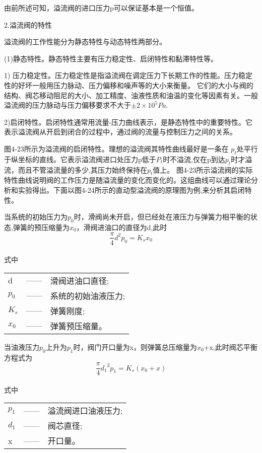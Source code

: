 \par 由前所述可知，溢流阀的进口压力p可以保证基本是一个恒值。
\par 2.溢流阀的特性
\par 溢流阀的工作性能分为静态特性与动态特性两部分。
\par (1)静态特性。静态特性主要有压力稳定性、启闭特性和黏滞特性等。
\par 1) 压力稳定性。压力稳定性是指溢流阀在调定压力下长期工作的性能。压力稳定性的好坏一般用压力脉动、压力偏移和噪声等的大小来衡量。
它们的大小与阀的结构、阀芯移动阻尼的大小、加工精度、油液性质和油温的变化等因素有关。一般溢流阀的压力脉动与压力偏移要求不大于$\pm2×10^5Pa$.
\par 2)启闭特性。启闭特性通常用流量-压力曲线表示，是静态特性中的重要特性。它表示溢流阀从开启到闭合的过程中，通过阀的流量与控制压力之间的关系。
\par 图4-23所示为溢流阀的启闭特性。理想的溢流阀其特性曲线最好是一条在 $p_t$处平行于纵坐标的直线。它表示溢流阀进口处压力p低于$P_t$时不溢流,仅在p到达$p_t$时才溢流，而且不管溢流量的多少,其压力始终保持在$p_t$值上。
图4-23所示溢流阀的实际特性曲线说明阀的工作压力是随溢流量的变化而变化的。这组曲线可以通过理论分析和实验得出。下面以图4-24所示的直动型溢流阀的原理图为例,来分析其启闭特性。
\par 当系统的初始压力为$p_0$时，滑阀尚未开启，但已经处在液压力与弹簧力相平衡的状态,弹簧的预压缩量为$x_0$，滑阀进油口的直径为d,此时
\begin{equation}
   \frac{\pi}{4}d^2p_0=K_sx_0\tag{4-3}
\end{equation}
\\式中\ 
\begin{tabular}[t]{lp{8mm}l}
   d &—— &滑阀进油口直径;\\
   $p_{0}$ &—— & 系统的初始油液压力;\\
   $K_s$ &——&弹簧刚度;\\
  $x_0$&——&弹簧预压缩量。\\
\end{tabular}
\par 当油液压力$p_0$上升为$p_1$时，阀门开口量为x，则弹簧总压缩量为$x_0$+x,此时阀芯平衡方程式为
\begin{equation}
   \frac{\pi}{4}{d_1}^2p_1=K_s(x_0+x)\tag{4-4}
\end{equation}
\\式中\ 
\begin{tabular}[t]{lp{8mm}l}
   $p_{1}$ &—— &溢流阀进口油液压力;\\
   $d_{1}$ &—— & 阀芯直径;\\
   x &——&开口量。\\
\end{tabular}
